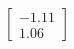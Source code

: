 \documentclass[preview]{standalone}
\begin{document}
\begin{align*}
\begin{bmatrix} -1.11 \\ 1.06 \end{bmatrix}
\end{align*}
\end{document}
